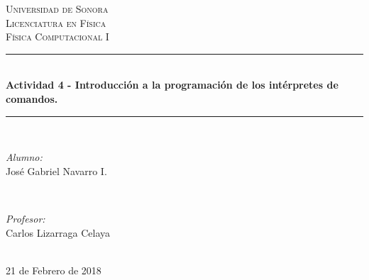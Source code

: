 \documentclass[12pt]{article}
\begin{document}
\begin{titlepage}

\newcommand{\HRule}{\rule{\linewidth}{0.5mm}} %

\center 

\textsc{\LARGE Universidad de Sonora}\\[1.5cm]
\textsc{\Large Licenciatura en Física}\\[0.5cm]
\textsc{\large Física Computacional I}\\[0.5cm]


\HRule \\[0.4cm]
{\huge \bfseries Actividad 4 - Introducción a la programación de los intérpretes de comandos.}\\[0.4cm] %
\HRule \\[1.5cm]
 

\begin{minipage}{0.4\textwidth}
\begin{flushleft} \large
\emph{Alumno:}\\
José Gabriel Navarro I.
\end{flushleft}
\end{minipage}
~
\begin{minipage}{0.4\textwidth}
\begin{flushright} \large
\emph{Profesor:} \\
Carlos Lizarraga Celaya
\end{flushright}
\end{minipage}\\[2cm]


21 de Febrero de 2018



\end{titlepage}
\end{document}
